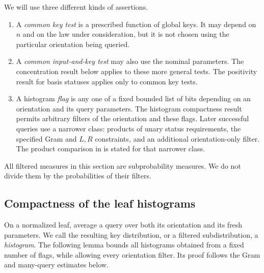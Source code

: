 We will use three different kinds of assertions.
\begin{enumerate}[label=(\roman*)]
\item A \emph{common key test} is a prescribed function of global keys.
It may depend on $n$ and on the law under consideration, but it is not
chosen using the particular orientation being queried.
\item A \emph{common input-and-key test} may also use the nominal
parameters. The concentration result below applies to these more
general tests. The positivity result for basis statuses applies only to
common key tests.
\item A histogram \emph{flag} is any one of a fixed bounded list of bits
depending on an orientation and its query parameters. The histogram
compactness result permits arbitrary filters of the orientation and
these flags. Later successful queries use a narrower class: products of
unary status requirements, the specified Gram and $L,R$ constraints,
and an additional orientation-only filter. The product comparison in
 is stated for that narrower class.
\end{enumerate}
All filtered measures in this section are subprobability measures. We do
not divide them by the probabilities of their filters.

\subsection{Compactness of the leaf histograms}

On a normalized leaf, average a query over both its orientation and its
fresh parameters. We call the resulting key distribution, or a filtered
subdistribution, a \emph{histogram}. The following lemma bounds all
histograms obtained from a fixed number of flags, while allowing every
orientation filter. Its proof follows the Gram and many-query estimates
below.

